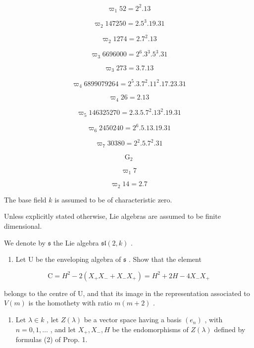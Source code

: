 \[
\varpi_ {1} 52 = 2 ^ {2}.13
\]

\[
\varpi_ {2} 147250 = 2.5 ^ {3}.19.31
\]

\[
\varpi_ {2} 1274 = 2.7 ^ {2}.13
\]

\[
\varpi_ {3} 6696000 = 2 ^ {6}.3 ^ {3}.5 ^ {3}.31
\]

\[
\varpi_ {3} 273 = 3.7.13
\]

\[
\varpi_ {4} 6899079264 = 2 ^ {5}.3.7 ^ {2}.11 ^ {2}.17.23.31
\]

\[
\varpi_ {4} 26 = 2.13
\]

\[
\varpi_ {5} 146325270 = 2.3.5.7 ^ {2}.13 ^ {2}.19.31
\]

\[
\varpi_ {6} 2450240 = 2 ^ {6}.5.13.19.31
\]

\[
\varpi_ {7} 30380 = 2 ^ {2}.5.7 ^ {2}.31
\]

\[
\mathrm{G} _ {2}
\]

\[
\varpi_ {1} 7
\]

\[
\varpi_ {2} 14 = 2.7
\]


The base field \(k\) is assumed to be of characteristic zero.

Unless explicitly stated otherwise, Lie algebras are assumed to be finite dimensional.


We denote by \(\mathfrak{s}\) the Lie algebra \(\mathfrak{sl}(2,k)\) .

\begin{enumerate}
\def\labelenumi{\arabic{enumi})}
\tightlist
\item
  Let \(\mathrm{U}\) be the enveloping algebra of \(\mathfrak{s}\) . Show that the element
\end{enumerate}

\[
\mathrm{C} = H ^ {2} - 2 (X _ {+} X _ {-} + X _ {-} X _ {+}) = H ^ {2} + 2 H - 4 X _ {-} X _ {+}
\]

belongs to the centre of U, and that its image in the representation associated to \(V(m)\) is the homothety with ratio \(m(m+2)\) .

\begin{enumerate}
\def\labelenumi{\arabic{enumi})}
\setcounter{enumi}{1}
\tightlist
\item
  Let \(\lambda \in k\) , let \(Z(\lambda)\) be a vector space having a basis \((e_n)\) , with \(n = 0,1,\ldots\) , and let \(X_{+}, X_{-}, H\) be the endomorphisms of \(Z(\lambda)\) defined by formulas (2) of Prop. 1.
\end{enumerate}

